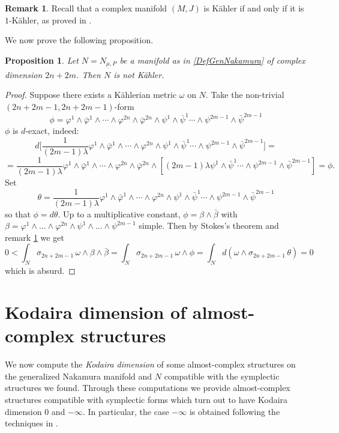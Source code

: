 \documentclass[a4paper, 11pt]{amsart}
\theoremstyle{plain}
\newtheorem{proposizione}{Proposition} [section]
\theoremstyle{definition}
\newtheorem{osservazione}{Remark}[section]
\numberwithin{equation}{section}
\begin{document}
\begin{osservazione}\label{KahlerE1kahler}
Recall that a complex manifold $(M, J)$ is K\"ahler if and only if it is $1$-K\"ahler, as proved in \cite[proposition 1.15]{AA}.
\end{osservazione}
We now prove the following proposition.
\begin{proposizione}\label{NNotKahler}
    Let $N = N_{\underline{\mu}, P}$ be a manifold as in \eqref{DefGenNakamura} of complex dimension $2n+2m$. Then $N$ is not K\"ahler.
\end{proposizione}
\begin{proof}
    Suppose there exists a K\"ahlerian metric $\omega$ on $N$. Take the non-trivial $(2n+2m-1, 2n+2m-1)$-form
    \[\phi =\varphi^{1} \wedge \bar\varphi^{1} \wedge \cdots \wedge \varphi^{2n} \wedge \bar\varphi^{2n} \wedge\psi^{1}\wedge \bar\psi^{1}\cdots \wedge \psi^{2m-1} \wedge \bar\psi^{2m-1} \]
    $\phi$ is $d$-exact, indeed:
    \[d\bigg[\frac{1}{(2m-1)\lambda}\varphi^{1} \wedge \bar\varphi^{1} \wedge \cdots \wedge \varphi^{2n}\wedge\psi^{1}\wedge \bar\psi^{1}\cdots \wedge \psi^{2m-1} \wedge \bar\psi^{2m-1}\bigg] = \]
    \[= \frac{1}{(2m-1)\lambda}\varphi^{1} \wedge \bar\varphi^{1} \wedge \cdots \wedge \varphi^{2n} \wedge \bar\varphi^{2n}\wedge [(2m-1)\lambda\psi^{1}\wedge \bar\psi^{1}\cdots \wedge \psi^{2m-1} \wedge \bar\psi^{2m-1}] = \phi.\]
    Set 
    $$
    \theta = \frac{1}{(2m-1)\lambda}\varphi^{1} \wedge \bar\varphi^{1} \wedge \cdots \wedge \varphi^{2n}\wedge\psi^{1}\wedge \bar\psi^{1}\cdots \wedge \psi^{2m-1} \wedge \bar\psi^{2m-1}
    $$
    so that $\phi = d\theta$. Up to a multiplicative constant, $\phi = \beta \wedge \bar\beta$ with $\beta = \varphi^{1} \wedge ... \wedge \varphi^{2n} \wedge \psi^1 \wedge ... \wedge \psi^{2m-1}$ simple.
    Then by Stokes's theorem and remark \ref{KahlerE1kahler} we get
    \[0 < \int_{N} \sigma_{2n+2m-1}\,\omega \wedge \beta \wedge \bar\beta = \int_{N} \sigma_{2n+2m-1} \,\omega \wedge \phi = \int_{N} d(\omega \wedge \sigma_{2n+2m-1}\,\theta) = 0\]
    which is absurd.
\end{proof}

\section{Kodaira dimension of almost-complex structures}
We now compute the \textit{Kodaira dimension} of some almost-complex structures on the generalized Nakamura manifold and $N$ compatible with the symplectic structures we found. Through these computations we provide almost-complex structures compatible with symplectic forms which turn out to have Kodaira dimension $0$ and $-\infty$. In particular, the case $ -\infty $ is obtained following the techniques in \cite{CNT}.
\end{document}
